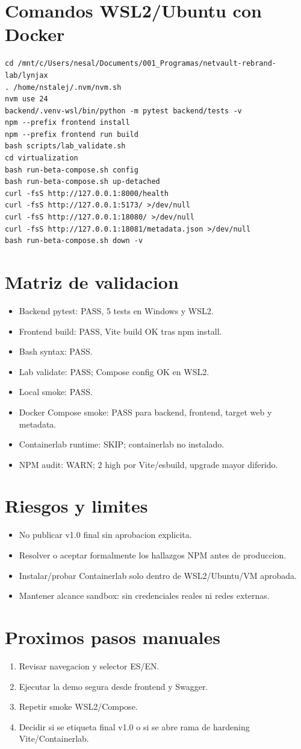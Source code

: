 \documentclass[11pt]{article}
\begin{document}
\section{Comandos WSL2/Ubuntu con Docker}
\begin{verbatim}
cd /mnt/c/Users/nesal/Documents/001_Programas/netvault-rebrand-lab/lynjax
. /home/nstalej/.nvm/nvm.sh
nvm use 24
backend/.venv-wsl/bin/python -m pytest backend/tests -v
npm --prefix frontend install
npm --prefix frontend run build
bash scripts/lab_validate.sh
cd virtualization
bash run-beta-compose.sh config
bash run-beta-compose.sh up-detached
curl -fsS http://127.0.0.1:8000/health
curl -fsS http://127.0.0.1:5173/ >/dev/null
curl -fsS http://127.0.0.1:18080/ >/dev/null
curl -fsS http://127.0.0.1:18081/metadata.json >/dev/null
bash run-beta-compose.sh down -v
\end{verbatim}

\section{Matriz de validacion}
\begin{itemize}
  \item Backend pytest: PASS, 5 tests en Windows y WSL2.
  \item Frontend build: PASS, Vite build OK tras npm install.
  \item Bash syntax: PASS.
  \item Lab validate: PASS; Compose config OK en WSL2.
  \item Local smoke: PASS.
  \item Docker Compose smoke: PASS para backend, frontend, target web y metadata.
  \item Containerlab runtime: SKIP; containerlab no instalado.
  \item NPM audit: WARN; 2 high por Vite/esbuild, upgrade mayor diferido.
\end{itemize}

\section{Riesgos y limites}
\begin{itemize}
  \item No publicar v1.0 final sin aprobacion explicita.
  \item Resolver o aceptar formalmente los hallazgos NPM antes de produccion.
  \item Instalar/probar Containerlab solo dentro de WSL2/Ubuntu/VM aprobada.
  \item Mantener alcance sandbox: sin credenciales reales ni redes externas.
\end{itemize}

\section{Proximos pasos manuales}
\begin{enumerate}
  \item Revisar navegacion y selector ES/EN.
  \item Ejecutar la demo segura desde frontend y Swagger.
  \item Repetir smoke WSL2/Compose.
  \item Decidir si se etiqueta final v1.0 o si se abre rama de hardening Vite/Containerlab.
\end{enumerate}
\end{document}
